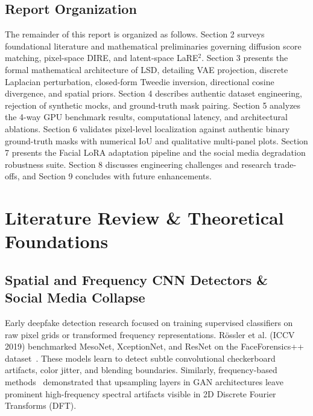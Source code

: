 \documentclass[12pt,a4paper]{report}
\begin{document}
\section{Report Organization}
The remainder of this report is organized as follows. Section 2 surveys foundational literature and mathematical preliminaries governing diffusion score matching, pixel-space DIRE, and latent-space LaRE$^2$. Section 3 presents the formal mathematical architecture of LSD, detailing VAE projection, discrete Laplacian perturbation, closed-form Tweedie inversion, directional cosine divergence, and spatial priors. Section 4 describes authentic dataset engineering, rejection of synthetic mocks, and ground-truth mask pairing. Section 5 analyzes the 4-way GPU benchmark results, computational latency, and architectural ablations. Section 6 validates pixel-level localization against authentic binary ground-truth masks with numerical IoU and qualitative multi-panel plots. Section 7 presents the Facial LoRA adaptation pipeline and the social media degradation robustness suite. Section 8 discusses engineering challenges and research trade-offs, and Section 9 concludes with future enhancements.

\clearpage

\chapter{Literature Review \& Theoretical Foundations}

\section{Spatial and Frequency CNN Detectors \& Social Media Collapse}
Early deepfake detection research focused on training supervised classifiers on raw pixel grids or transformed frequency representations. Rössler et al. (ICCV 2019) benchmarked MesoNet, XceptionNet, and ResNet on the FaceForensics++ dataset~\cite{rossler2019faceforensics}. These models learn to detect subtle convolutional checkerboard artifacts, color jitter, and blending boundaries. Similarly, frequency-based methods~\cite{frank2020leveraging} demonstrated that upsampling layers in GAN architectures leave prominent high-frequency spectral artifacts visible in 2D Discrete Fourier Transforms (DFT).
\end{document}
